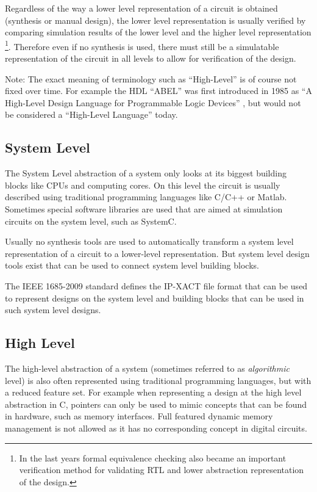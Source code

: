 Regardless of the way a lower level representation of a circuit is
obtained (synthesis or manual design), the lower level representation is usually
verified by comparing simulation results of the lower level and the higher level
representation \footnote{In the last years formal equivalence 
checking also became an important verification method for validating RTL and 
lower abstraction representation of the design.}.
Therefore even if no synthesis is used, there must still be a simulatable
representation of the circuit in all levels to allow for verification of the
design.

Note: The exact meaning of terminology such as ``High-Level'' is of course not
fixed over time. For example the HDL ``ABEL'' was first introduced in 1985 as ``A High-Level
Design Language for Programmable Logic Devices'' \cite{ABEL}, but would not
be considered a ``High-Level Language'' today.

\subsection{System Level}

The System Level abstraction of a system only looks at its biggest building
blocks like CPUs and computing cores. On this level the circuit is usually described
using traditional programming languages like C/C++ or Matlab. Sometimes special
software libraries are used that are aimed at simulation circuits on the system
level, such as SystemC.

Usually no synthesis tools are used to automatically transform a system level
representation of a circuit to a lower-level representation. But system level
design tools exist that can be used to connect system level building blocks.

The IEEE 1685-2009 standard defines the IP-XACT file format that can be used to
represent designs on the system level and building blocks that can be used in
such system level designs. \cite{IP-XACT}

\subsection{High Level}

The high-level abstraction of a system (sometimes referred to as {\it
algorithmic} level) is also often represented using traditional programming
languages, but with a reduced feature set. For example when representing a
design at the high level abstraction in C, pointers can only be used to mimic
concepts that can be found in hardware, such as memory interfaces. Full
featured dynamic memory management is not allowed as it has no corresponding
concept in digital circuits.

